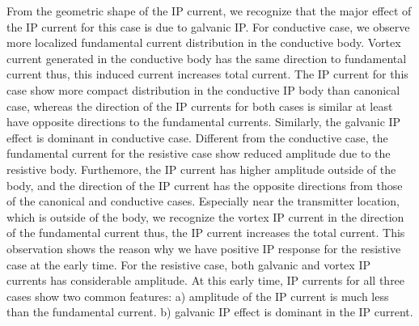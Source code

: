 \documentclass[a4paper, 11pt]{article}
\begin{document}
From the geometric shape of the IP current, we recognize that the major effect of the IP current for this case is due to galvanic IP. For conductive case, we observe more localized fundamental current distribution in the conductive body. Vortex current generated in the conductive body has the same direction to fundamental current thus, this induced current increases total current.  The IP current for this case show more compact distribution in the conductive IP body than canonical case, whereas the direction of the IP currents for both cases is similar at least have opposite directions to the fundamental currents. Similarly, the galvanic IP effect is dominant in conductive case. Different from the conductive case, the fundamental current for the resistive case show reduced amplitude due to the resistive body. Furthemore, the IP current has higher amplitude outside of the body, and the direction of the IP current has the opposite directions from those of the canonical and conductive cases. Especially near the transmitter location, which is outside of the body, we recognize the vortex IP current in the direction of the fundamental current thus, the IP current increases the total current. This observation shows the reason why we have positive IP response for the resistive case at the early time. For the resistive case, both galvanic and vortex IP currents has considerable amplitude. At this early time, IP currents for all three cases show two common features: a) amplitude of the IP current is much less than the fundamental current. b) galvanic IP effect is dominant in the IP current. 
\end{document}
